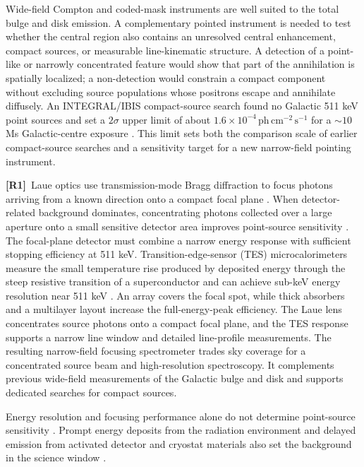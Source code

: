 \documentclass[11pt]{article}
\newcommand{\revmark}[1]{\textcolor{revisionblue}{\textbf{[R#1]}}\ }
\newcommand{\phcms}{\ensuremath{\,\mathrm{ph\,cm^{-2}\,s^{-1}}}}
\begin{document}
Wide-field Compton and coded-mask instruments are well suited to the total
bulge and disk emission. A complementary pointed instrument is needed to test
whether the central region also contains an unresolved central enhancement,
compact sources, or measurable line-kinematic structure. A detection of a
point-like or narrowly concentrated feature would show that part of the
annihilation is spatially localized; a non-detection would constrain a compact
component without excluding source populations whose positrons escape and
annihilate diffusely. An INTEGRAL/IBIS compact-source search found no Galactic
511 keV point sources and set a $2\sigma$ upper limit of about
$1.6\times10^{-4}\phcms$ for a $\sim10$ Ms Galactic-centre exposure
\cite{DeCesare2011}. This limit sets both the comparison scale of earlier
compact-source searches and a sensitivity target for a new narrow-field
pointing instrument.

\revmark{1}Laue optics use transmission-mode Bragg diffraction to focus photons arriving
from a known direction onto a compact focal plane
\cite{Barriere2009Laue,Barriere2011LauePrototype}. When detector-related
background dominates, concentrating photons collected over a large aperture
onto a small sensitive detector area improves point-source sensitivity
\cite{Weidenspointner2006MAX}. The focal-plane detector must combine a narrow
energy response with sufficient stopping efficiency at 511 keV.
Transition-edge-sensor (TES) microcalorimeters measure the small temperature
rise produced by deposited energy through the steep resistive transition of a
superconductor and can achieve sub-keV energy resolution near 511 keV
\cite{Shirazi2023,Zhang2022TESGamma}. An array covers the focal spot, while thick
absorbers and a multilayer layout increase the full-energy-peak efficiency. The
Laue lens concentrates source photons onto a compact focal plane, and the TES
response supports a narrow line window and detailed line-profile measurements.
The resulting narrow-field focusing spectrometer trades sky coverage for a
concentrated source beam and high-resolution spectroscopy. It complements
previous wide-field measurements of the Galactic bulge and disk and supports
dedicated searches for compact sources.

Energy resolution and focusing performance alone do not determine point-source
sensitivity \cite{Shirazi2023,Hu2026}. Prompt energy deposits from the radiation
environment and delayed emission from activated detector and cryostat materials
also set the background in the science window
\cite{Gallego2025Balloon,Tian2026DIXE}.
\end{document}
